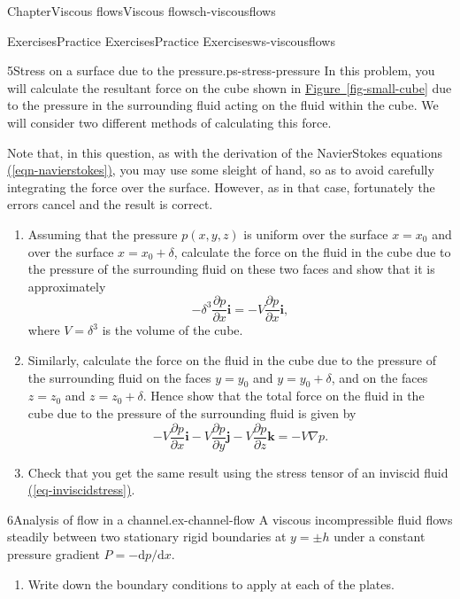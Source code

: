 \documentclass[oneside,10pt,]{book}
\newcommand{\xreffont}{\relax}
\numberwithin{equation}{section}
\newcommand{\de}{\mathrm{d}}
\newcommand{\pd}[2]{\frac{\partial#1}{\partial#2}}
\newcommand{\bi}{\boldsymbol{i}}
\newcommand{\bj}{\boldsymbol{j}}
\newcommand{\bk}{\boldsymbol{k}}
\begin{document}
\begin{chapterptx}{Chapter}{Viscous flows}{}{Viscous flows}{}{}{ch-viscousflows}
\begin{exercises-section}{Exercises}{Practice Exercises}{}{Practice Exercises}{}{}{ws-viscousflows}
\begin{divisionexercise}{5}{Stress on a surface due to the pressure.}{}{ps-stress-pressure}
In this problem, you will calculate the resultant force on the cube shown in \hyperref[fig-small-cube]{Figure~{\xreffont\ref{fig-small-cube}}} due to the pressure in the surrounding fluid acting on the fluid within the cube. We will consider two different methods of calculating this force.%
 \par
Note that, in this question, as with the derivation of the Navier\textendash{}Stokes equations \hyperref[eqn-navierstokes]{({\xreffont\ref{eqn-navierstokes}})}, you may use some sleight of hand, so as to avoid carefully integrating the force over the surface. However, as in that case, fortunately the errors cancel and the result is correct.%
\begin{enumerate}[font=\bfseries,label=(\alph*),ref=\alph*]%
\item{}Assuming that the pressure \(p(x,y,z)\) is uniform over the surface \(x=x_0\) and over the surface \(x=x_0+\delta\), calculate the force on the fluid in the cube due to the pressure of the surrounding fluid on these two faces and show that it is approximately%
\begin{equation*}
-\delta^3\pd{p}{x}\bi=-V\pd{p}{x}\bi,
\end{equation*}
where \(V=\delta^3\) is the volume of the cube.%
\item{}Similarly, calculate the force on the fluid in the cube due to the pressure of the surrounding fluid on the faces \(y=y_0\) and \(y=y_0+\delta\), and on the faces \(z=z_0\) and \(z=z_0+\delta\). Hence show that the total force on the fluid in the cube due to the pressure of the surrounding fluid is given by%
\begin{equation*}
-V\pd{p}{x}\bi-V\pd{p}{y}\bj-V\pd{p}{z}\bk=-V\nabla p.
\end{equation*}
%
\item{}Check that you get the same result using the stress tensor of an inviscid fluid \hyperref[eq-inviscidstress]{({\xreffont\ref{eq-inviscidstress}})}.%
\end{enumerate}%
\end{divisionexercise}%
\begin{divisionexercise}{6}{Analysis of flow in a channel.}{}{ex-channel-flow}%
A viscous incompressible fluid flows steadily between two stationary rigid boundaries at \(y=\pm h\) under a constant pressure gradient \(P=-\de p/\de x\).%
\begin{enumerate}[font=\bfseries,label=(\alph*),ref=\alph*]%
\item{}Write down the boundary conditions to apply at each of the plates.%

\end{enumerate}
\end{divisionexercise}
\end{exercises-section}
\end{chapterptx}
\end{document}

